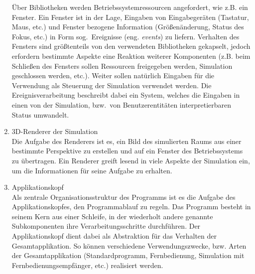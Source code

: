 \documentclass[11pt,twoside,a4paper]{article}
\begin{document}
\begin{enumerate}
Über Bibliotheken werden Betriebssystemressourcen angefordert, wie z.B. ein Fenster. Ein Fenster ist in der Lage, Eingaben von Eingabegeräten (Tastatur, Maus, etc.) und Fenster bezogene Information (Größenänderung, Status des Fokus, etc.) in Form sog.~Ereignisse (eng. \textit{events}) zu liefern. Verhalten des Fensters sind größtenteils von den verwendeten Bibliotheken gekapselt, jedoch erfordern bestimmte Aspekte eine Reaktion weiterer Komponenten (z.B. beim Schließen des Fensters sollen Ressourcen freigegeben werden, Simulation geschlossen werden, etc.).
Weiter sollen natürlich Eingaben für die Verwendung als Steuerung der Simulation verwendet werden. Die Ereignisverarbeitung beschreibt dabei ein System, welches die Eingaben in einen von der Simulation, bzw.~von Benutzerentitäten interpretierbaren Status umwandelt.
\item 3D-Renderer der Simulation\\
Die Aufgabe des Renderers ist es, ein Bild des simulierten Raums aus einer bestimmte Perspektive zu erstellen und auf ein Fenster des Betriebssystems zu übertragen.
Ein Renderer greift lesend in viele Aspekte der Simulation ein, um die Informationen für seine Aufgabe zu erhalten.
\item Applikationskopf\\
Als zentrale Organisationsstruktur des Programms ist es die Aufgabe des Applikationskopfes, den Programmablauf zu regeln. Das Programm besteht in seinem Kern aus einer Schleife, in der wiederholt andere genannte Subkomponenten ihre Verarbeitungsschritte durchführen. Der Applikationskopf dient dabei als Abstraktion für das Verhalten der Gesamtapplikation. So können verschiedene Verwendungszwecke, bzw. Arten der Gesamtapplikation (Standardprogramm, Fernbedienung, Simulation mit Fernbedienungsempfänger, etc.) realisiert werden.
\end{enumerate}
\end{document}
